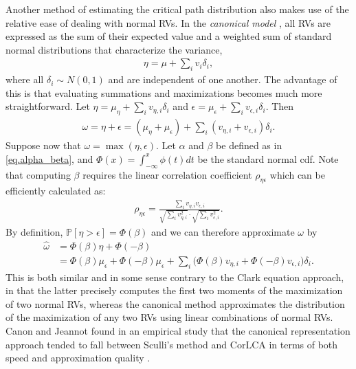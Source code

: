 \documentclass[12pt]{article}
\def\P{\mathbb{P}}
\begin{document}
Another method of estimating the critical path distribution also makes use of the relative ease of dealing with normal RVs. In the {\em canonical model} \cite{vis06,zha06}, all RVs are expressed as the sum of their expected value and a weighted sum of standard normal distributions that characterize the variance, 
\begin{align*}
\eta = \mu + \sum_i v_i \delta_i,
\end{align*}  
where all $\delta_i \sim N(0, 1)$ and are independent of one another. The advantage of this is that evaluating summations and maximizations becomes much more straightforward. Let $\eta = \mu_\eta + \sum_i v_{\eta, i} \delta_i$ and $\epsilon = \mu_\epsilon + \sum_i v_{\epsilon, i} \delta_i$. Then 
\begin{align*}
\omega = \eta + \epsilon = (\mu_\eta + \mu_\epsilon) + \sum_i (v_{\eta, i} + v_{\epsilon, i}) \delta_i.
\end{align*}
Suppose now that $\omega = \max(\eta, \epsilon)$. Let $\alpha$ and $\beta$ be defined as in \eqref{eq.alpha_beta}, and $\Phi(x) = \int_{-\infty}^{x} \phi(t) dt$ be the standard normal cdf. Note that computing $\beta$ requires the linear correlation coefficient $\rho_{\eta\epsilon}$ which can be efficiently calculated as:
\begin{align*}
\rho_{\eta\epsilon} = \frac{\sum_i v_{\eta, i} v_{\epsilon, i}}{\sqrt{\sum_i v_{\eta, i}^2} \cdot \sqrt{\sum_i v_{\epsilon, i}^2} }.
\end{align*}
By definition, $\P[\eta > \epsilon] = \Phi(\beta)$ and we can therefore approximate $\omega$ by 
\begin{align*}
\hat{\omega} &= \Phi(\beta)\eta + \Phi(-\beta) \\
&= \Phi(\beta) \mu_\epsilon + \Phi(-\beta) \mu_\epsilon + \sum_i \big( \Phi(\beta) v_{\eta, i} + \Phi(-\beta) v_{\epsilon, i} \big) \delta_i.
\end{align*}
This is both similar and in some sense contrary to the Clark equation approach, in that the latter precisely computes the first two moments of the maximization of two normal RVs, whereas the canonical method approximates the distribution of the maximization of any two RVs using linear combinations of normal RVs. Canon and Jeannot found in an empirical study that the canonical representation approach tended to fall between Sculli's method and CorLCA in terms of both speed and approximation quality \cite{can16}. 

\end{document}
